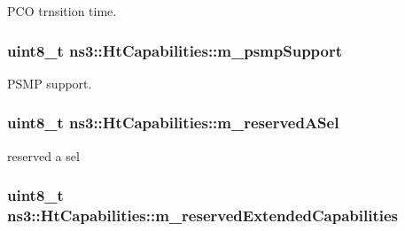 P\+CO trnsition time. 

\subsubsection[{\texorpdfstring{m\+\_\+psmp\+Support}{m_psmpSupport}}]{\setlength{\rightskip}{0pt plus 5cm}uint8\+\_\+t ns3\+::\+Ht\+Capabilities\+::m\+\_\+psmp\+Support\hspace{0.3cm}{\ttfamily [private]}}\hypertarget{classns3_1_1HtCapabilities_af0a8b984d6bd723aa9e51f00ac609b1a}{}\label{classns3_1_1HtCapabilities_af0a8b984d6bd723aa9e51f00ac609b1a}


P\+S\+MP support. 

\subsubsection[{\texorpdfstring{m\+\_\+reserved\+A\+Sel}{m_reservedASel}}]{\setlength{\rightskip}{0pt plus 5cm}uint8\+\_\+t ns3\+::\+Ht\+Capabilities\+::m\+\_\+reserved\+A\+Sel\hspace{0.3cm}{\ttfamily [private]}}\hypertarget{classns3_1_1HtCapabilities_af9f5027f3ed34e485a5edad6142ffd3f}{}\label{classns3_1_1HtCapabilities_af9f5027f3ed34e485a5edad6142ffd3f}


reserved a sel 

\subsubsection[{\texorpdfstring{m\+\_\+reserved\+Extended\+Capabilities}{m_reservedExtendedCapabilities}}]{\setlength{\rightskip}{0pt plus 5cm}uint8\+\_\+t ns3\+::\+Ht\+Capabilities\+::m\+\_\+reserved\+Extended\+Capabilities\hspace{0.3cm}{\ttfamily [private]}}\hypertarget{classns3_1_1HtCapabilities_a87d11401a6a2835f2ddf0e586ed77544}{}\label{classns3_1_1HtCapabilities_a87d11401a6a2835f2ddf0e586ed77544}


